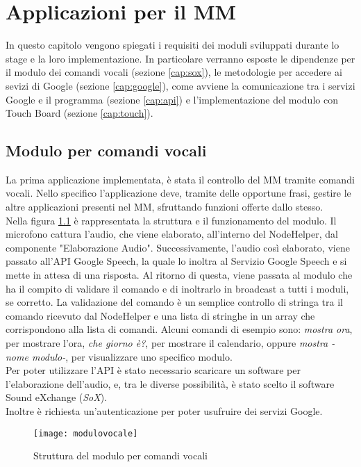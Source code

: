 \chapter{Applicazioni per il MM}\label{capitolo4}
In questo capitolo vengono spiegati i requisiti dei moduli sviluppati durante lo stage e la loro implementazione.
In particolare verranno esposte le dipendenze per il modulo dei comandi vocali (sezione \ref{cap:sox}), le metodologie
per accedere ai sevizi di Google (sezione \ref{cap:google}), come avviene la comunicazione tra i servizi Google e il programma (sezione \ref{cap:api})
e l'implementazione del modulo con Touch Board (sezione \ref{cap:touch}).

\section{Modulo per comandi vocali}\label{cap:voce}
La prima applicazione implementata, \`e
stata il controllo del MM tramite comandi vocali.
Nello specifico l'applicazione deve, tramite delle opportune frasi,
gestire le altre applicazioni presenti nel MM, sfruttando funzioni offerte dallo stesso.\\
Nella figura \ref{fig:modulovocale} \`e rappresentata la struttura e il funzionamento del modulo.
Il microfono cattura l'audio, che viene elaborato, all'interno del NodeHelper, dal componente "Elaborazione Audio".
Successivamente, l'audio cos\`i elaborato, viene
passato all'API Google Speech, la quale lo inoltra al Servizio Google Speech e si mette in attesa di una risposta.
Al ritorno di questa, viene passata al modulo che ha il compito di validare il comando e di inoltrarlo in broadcast a tutti i moduli, se
corretto.
La validazione del comando \`e un semplice controllo di stringa tra il comando ricevuto dal NodeHelper e una lista di stringhe in un array che
corrispondono alla lista di comandi.
Alcuni comandi di esempio sono: \emph{mostra ora}, per mostrare l'ora, \emph{che giorno \`e?}, per mostrare
il calendario, oppure \emph{mostra -nome modulo-}, per visualizzare uno specifico modulo.\\
Per poter utilizzare l'API \`e stato necessario scaricare un software per l'elaborazione dell'audio, e,
tra le diverse possibilit\`a, \`e stato scelto il software Sound eXchange (\emph{SoX}).\\
Inoltre \`e richiesta un'autenticazione per poter usufruire dei servizi Google.

\begin{figure}[H]
    \texttt{[image: modulovocale]}
    \caption{Struttura del modulo per comandi vocali}
    \label{fig:modulovocale}
\end{figure}

